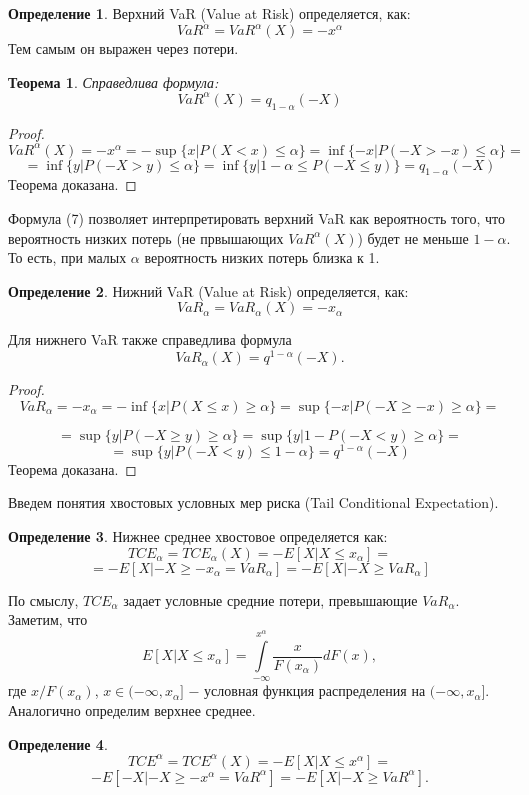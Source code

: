 \documentclass[14pt,a4paper]{article}
\theoremstyle{plain}
\newtheorem{Th}{Теорема}[section]
\theoremstyle{definition}
\newtheorem{Def}{Определение}[section]
\begin{document}
\begin{Def} \label{main}
Верхний VaR (Value at Risk) определяется, как:
$$
VaR^{\alpha} = VaR^{\alpha} (X) = -x^{\alpha}
$$
Тем самым он выражен через потери.
\end{Def}

\begin{Th} \label{main}
Справедлива формула:
\begin{equation}
VaR^{\alpha} (X) = q_{1-\alpha}(-X)
\end{equation}
\end{Th}
\begin{proof}
$$
VaR^{\alpha} (X) = -x^{\alpha} = - \sup\{x |P(X<x) \le \alpha  \}=\inf\{-x |P(-X>-x) \le \alpha  \}=
$$
\center
[замена $-x = y$]
$$
=\inf\{y |P(-X>y) \le \alpha  \}=\inf\{y |1-\alpha \le P(-X \le y)  \} = q_{1-\alpha}(-X)
$$
Теорема доказана.
\end{proof}
Формула (7) позволяет интерпретировать верхний VaR как вероятность того, что вероятность низких потерь (не првышающих $VaR^{\alpha}(X)$) будет не меньше $1-\alpha$. То есть, при малых $\alpha$ вероятность низких потерь близка к 1.

\begin{Def} \label{main}
Нижний VaR (Value at Risk) определяется, как:
$$
VaR_{\alpha} = VaR_{\alpha} (X) =  -x_{\alpha}
$$
\end{Def}
Для нижнего VaR также справедлива формула
\begin{equation}
VaR_{\alpha} (X) = q^{1-\alpha}(-X).
\end{equation}
\begin{proof}
$$
VaR_\alpha = -x_{\alpha} = -\inf \{x| P(X \le x) \ge \alpha \} = \sup \{-x| P(-X \ge -x) \ge \alpha \} =
$$
\center
[замена $-x = y$]

$$
=\sup\{y|P(-X \ge y) \ge \alpha\}=\sup\{y |1 - P(-X < y) \ge \alpha  \} =
$$
$$
=\sup\{y |P(-X < y) \le 1-\alpha  \} = q^{1-\alpha}(-X)
$$
Теорема доказана.
\end{proof}
Введем понятия хвостовых условных мер риска (Tail Conditional Expectation).
\begin{Def} \label{main}
Нижнее среднее хвостовое определяется как:
$$
TCE_{\alpha} = TCE_{\alpha}(X) = -E[X|X \le x_{\alpha}] =
$$
$$
=-E[X| -X \ge -x_{\alpha}=VaR_{\alpha}] = -E[X| -X \ge VaR_{\alpha}]
$$
\end{Def}
По смыслу, $TCE_{\alpha}$ задает условные средние потери, превышающие $VaR_{\alpha}$.
Заметим, что
$$
E[X|X \le x_{\alpha}] = \int\limits_{-\infty}^{x^{\alpha}} \frac{x}{F(x_\alpha)}dF(x),
$$
где ${x}/{F(x_\alpha)}$, $x \in (-\infty, x_\alpha] $ $-$ условная функция распределения на $(-\infty, x_\alpha]$.
Аналогично определим верхнее среднее.
\begin{Def} \label{main}
$$
TCE^{\alpha} = TCE^{\alpha}(X) = -E[X|X \le x^{\alpha}] =
$$
$$
-E[-X| -X \ge -x^{\alpha}=VaR^{\alpha}] = -E[X| -X \ge VaR^{\alpha}].
$$
\end{Def}
\end{document}
